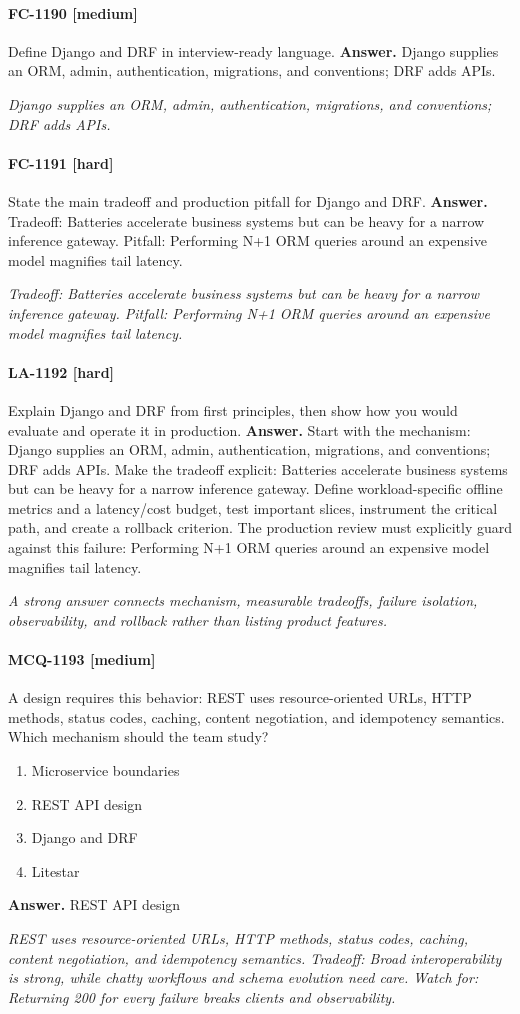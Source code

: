 \paragraph{FC-1190 [medium]} Define Django and DRF in interview-ready language.
\noindent\textbf{Answer.} Django supplies an ORM, admin, authentication, migrations, and conventions; DRF adds APIs.
\par\textit{Django supplies an ORM, admin, authentication, migrations, and conventions; DRF adds APIs.}
\paragraph{FC-1191 [hard]} State the main tradeoff and production pitfall for Django and DRF.
\noindent\textbf{Answer.} Tradeoff: Batteries accelerate business systems but can be heavy for a narrow inference gateway. Pitfall: Performing N+1 ORM queries around an expensive model magnifies tail latency.
\par\textit{Tradeoff: Batteries accelerate business systems but can be heavy for a narrow inference gateway. Pitfall: Performing N+1 ORM queries around an expensive model magnifies tail latency.}
\paragraph{LA-1192 [hard]} Explain Django and DRF from first principles, then show how you would evaluate and operate it in production.
\noindent\textbf{Answer.} Start with the mechanism: Django supplies an ORM, admin, authentication, migrations, and conventions; DRF adds APIs. Make the tradeoff explicit: Batteries accelerate business systems but can be heavy for a narrow inference gateway. Define workload-specific offline metrics and a latency/cost budget, test important slices, instrument the critical path, and create a rollback criterion. The production review must explicitly guard against this failure: Performing N+1 ORM queries around an expensive model magnifies tail latency.
\par\textit{A strong answer connects mechanism, measurable tradeoffs, failure isolation, observability, and rollback rather than listing product features.}
\paragraph{MCQ-1193 [medium]} A design requires this behavior: REST uses resource-oriented URLs, HTTP methods, status codes, caching, content negotiation, and idempotency semantics. Which mechanism should the team study?
\begin{enumerate}[label=\Alph*.]
\item Microservice boundaries
\item REST API design
\item Django and DRF
\item Litestar
\end{enumerate}
\noindent\textbf{Answer.} REST API design
\par\textit{REST uses resource-oriented URLs, HTTP methods, status codes, caching, content negotiation, and idempotency semantics. Tradeoff: Broad interoperability is strong, while chatty workflows and schema evolution need care. Watch for: Returning 200 for every failure breaks clients and observability.}
